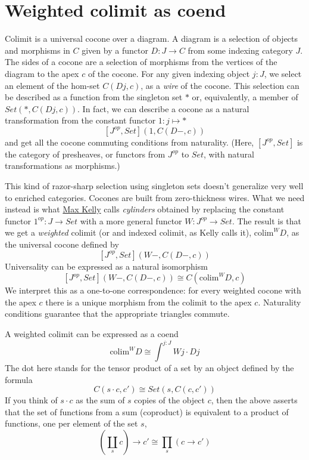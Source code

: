 \documentclass[11pt]{amsart}
\begin{document}
\section{Weighted colimit as coend}
Colimit is a universal cocone over a diagram. A diagram is a selection of objects and morphisms in $C$ given by a functor $D \colon J \to C$ from some indexing category $J$. The sides of a cocone are a selection of morphisms from the vertices of the diagram to the apex $c$ of the cocone. For any given indexing object $j \colon J$, we select an element of the hom-set $C(D j, c)$, as a \emph{wire} of the cocone. This selection can be described as a function from the singleton set $*$ or, equivalently, a member of $Set(*, C(D j, c))$. In fact, we can describe a cocone as a natural transformation from the constant functor $1 \colon j \mapsto *$
\[ [J^{op}, Set](1, C(D -, c))\]
and get all the cocone commuting conditions from naturality. (Here, $[J^{op}, Set]$ is the category of presheaves, or functors from $J^{op}$ to $Set$, with natural transformations as morphisms.)

This kind of razor-sharp selection using singleton sets doesn't generalize very well to enriched categories. Cocones are built from zero-thickness wires. What we need instead is what \href{http://www.tac.mta.ca/tac/reprints/articles/10/tr10.pdf}{Max Kelly} calls \emph{cylinders} obtained by replacing the constant functor $1^{op}\colon J \to Set$ with a more general functor $W \colon J^{op} \to Set$. The result is that we get a \emph{weighted} colimit (or and indexed colimit, as Kelly calls it), $\mbox{colim}^W D$, as the universal cocone defined by 
\[ [J^{op}, Set](W-, C(D -, c))\]
Universality can be expressed as a natural isomorphism
\[[J^{op}, Set](W-, C(D -, c))  \cong  C(\mbox{colim}^W D, c)\]
We interpret this as a one-to-one correspondence: for every weighted cocone with the apex $c$ there is a unique morphism from the colimit to the apex $c$. Naturality conditions guarantee that the appropriate triangles commute.

A weighted colimit can be expressed as a coend
\[\mbox{colim}^W D \cong \int^{j \colon J} W j \cdot D j\]
The dot here stands for the tensor product of a set by an object defined by the formula
\[C(s \cdot c, c') \cong Set(s, C(c, c'))\]
If you think of $s \cdot c$ as the sum of $s$ copies of the object $c$, then the above asserts that the set of functions from a sum (coproduct) is equivalent to a product of functions, one per element of the set $s$,
\[(\coprod_s c) \to c' \cong \prod_s (c \to c')\]
 
\end{document}
